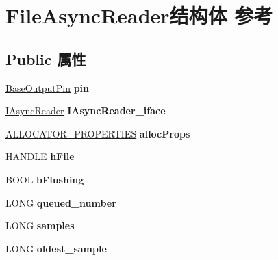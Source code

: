 \hypertarget{struct_file_async_reader}{}\section{File\+Async\+Reader结构体 参考}
\label{struct_file_async_reader}
\subsection*{Public 属性}
\begin{DoxyCompactItemize}
\item 
\mbox{\label{struct_file_async_reader_a693d5ad7fa7824514553bef364a03242}} 
\hyperlink{struct_base_output_pin}{Base\+Output\+Pin} {\bfseries pin}
\item 
\mbox{\label{struct_file_async_reader_a6da88fb23a76af9e08023dccd348e499}} 
\hyperlink{interface_i_async_reader}{I\+Async\+Reader} {\bfseries I\+Async\+Reader\+\_\+iface}
\item 
\mbox{\label{struct_file_async_reader_aabc242b650487d34558d0d3906d746f7}} 
\hyperlink{struct___allocator_properties}{A\+L\+L\+O\+C\+A\+T\+O\+R\+\_\+\+P\+R\+O\+P\+E\+R\+T\+I\+ES} {\bfseries alloc\+Props}
\item 
\mbox{\label{struct_file_async_reader_a9562c05990a421cef10a5db92359c4f9}} 
\hyperlink{interfacevoid}{H\+A\+N\+D\+LE} {\bfseries h\+File}
\item 
\mbox{\label{struct_file_async_reader_a83e12f4f9685c632a54313205081e65f}} 
B\+O\+OL {\bfseries b\+Flushing}
\item 
\mbox{\label{struct_file_async_reader_acd56c0c2c3901e07053cd9bff534dc01}} 
L\+O\+NG {\bfseries queued\+\_\+number}
\item 
\mbox{\label{struct_file_async_reader_aa2dc5a700c952691c9284a50e9a55d15}} 
L\+O\+NG {\bfseries samples}
\item 
\mbox{\label{struct_file_async_reader_aa49880168954e37a04ccd30f886625eb}} 
L\+O\+NG {\bfseries oldest\+\_\+sample}

\end{DoxyCompactItemize}
